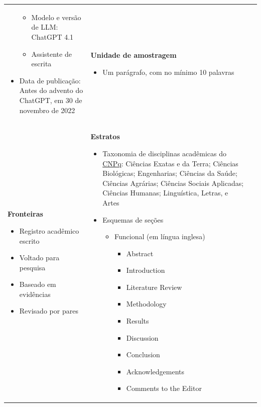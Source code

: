 \begin{longtable}[c]{ |p{8cm}|p{8cm}|p{8cm}| }
\begin{itemize}
        \begin{itemize}
            \item Modelo e versão de LLM: ChatGPT 4.1
            \item Assistente de escrita
        \end{itemize}
        \item Data de publicação: Antes do advento do ChatGPT, em 30 de novembro de 2022
    \end{itemize}
     &
    \textbf{Unidade de amostragem}
    \begin{itemize}
        \item Um parágrafo, com no mínimo 10 palavras
    \end{itemize}
     \\
    \textbf{Fronteiras}
    \begin{itemize}
        \item Registro acadêmico escrito
        \item Voltado para pesquisa
        \item Baseado em evidências
        \item Revisado por pares
    \end{itemize}
     &
    \textbf{Estratos}
    \begin{itemize}
        \item Taxonomia de disciplinas acadêmicas do \href{https://www.gov.br/cnpq/pt-br}{CNPq}: Ciências Exatas e da Terra; Ciências Biológicas; Engenharias; Ciências da Saúde; Ciências Agrárias; Ciências Sociais Aplicadas; Ciências Humanas; Linguística, Letras, e Artes
        \item Esquemas de seções
        \begin{itemize}
            \item Funcional (em língua inglesa)
            \begin{itemize}
                \item Abstract
                \item Introduction
                \item Literature Review
                \item Methodology
                \item Results
                \item Discussion
                \item Conclusion
                \item Acknowledgements
                \item Comments to the Editor

\end{itemize}
\end{itemize}
\end{itemize}
\end{longtable}
